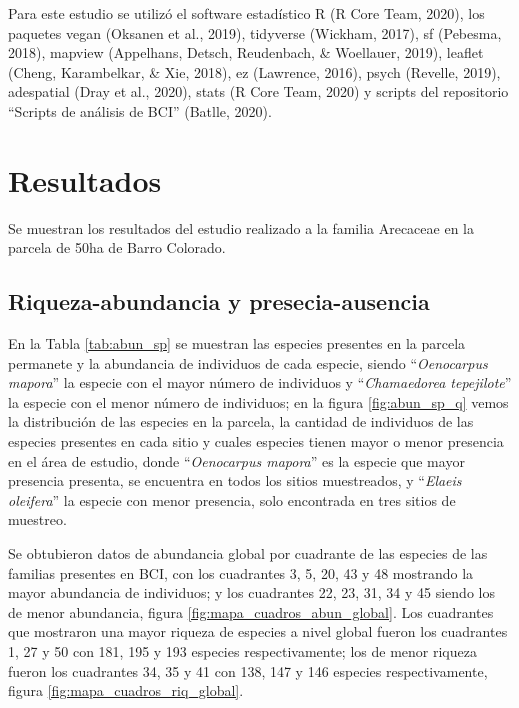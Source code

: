 \documentclass[11pt,]{article}
\begin{document}
Para este estudio se utilizó el software estadístico R (R Core Team,
2020), los paquetes vegan (Oksanen et al., 2019), tidyverse (Wickham,
2017), sf (Pebesma, 2018), mapview (Appelhans, Detsch, Reudenbach, \&
Woellauer, 2019), leaflet (Cheng, Karambelkar, \& Xie, 2018), ez
(Lawrence, 2016), psych (Revelle, 2019), adespatial (Dray et al., 2020),
stats (R Core Team, 2020) y scripts del repositorio ``Scripts de
análisis de BCI'' (Batlle, 2020).

\section{Resultados}\label{resultados}

Se muestran los resultados del estudio realizado a la familia Arecaceae
en la parcela de 50ha de Barro Colorado.

\subsection{Riqueza-abundancia y
presecia-ausencia}\label{riqueza-abundancia-y-presecia-ausencia}

En la Tabla \ref{tab:abun_sp} se muestran las especies presentes en la
parcela permanete y la abundancia de individuos de cada especie, siendo
``\emph{Oenocarpus mapora}'' la especie con el mayor número de
individuos y ``\emph{Chamaedorea tepejilote}'' la especie con el menor
número de individuos; en la figura \ref{fig:abun_sp_q} vemos la
distribución de las especies en la parcela, la cantidad de individuos de
las especies presentes en cada sitio y cuales especies tienen mayor o
menor presencia en el área de estudio, donde ``\emph{Oenocarpus
mapora}'' es la especie que mayor presencia presenta, se encuentra en
todos los sitios muestreados, y ``\emph{Elaeis oleifera}'' la especie
con menor presencia, solo encontrada en tres sitios de muestreo.

Se obtubieron datos de abundancia global por cuadrante de las especies
de las familias presentes en BCI, con los cuadrantes 3, 5, 20, 43 y 48
mostrando la mayor abundancia de individuos; y los cuadrantes 22, 23,
31, 34 y 45 siendo los de menor abundancia, figura
\ref{fig:mapa_cuadros_abun_global}. Los cuadrantes que mostraron una
mayor riqueza de especies a nivel global fueron los cuadrantes 1, 27 y
50 con 181, 195 y 193 especies respectivamente; los de menor riqueza
fueron los cuadrantes 34, 35 y 41 con 138, 147 y 146 especies
respectivamente, figura \ref{fig:mapa_cuadros_riq_global}.
\end{document}
